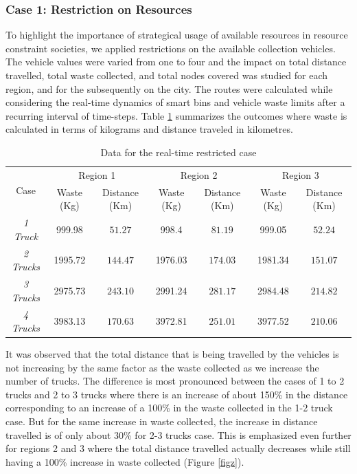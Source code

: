 \documentclass[12pt]{article}
\begin{document}
\subsubsection*{Case 1: Restriction on Resources}
To highlight the importance of strategical usage of available resources in resource constraint societies, we applied restrictions on the available collection vehicles. The vehicle values were varied from one to four and the impact on total distance travelled, total waste collected, and total nodes covered was studied for each region, and for the subsequently on the city. The routes were calculated while considering the real-time dynamics of smart bins and vehicle waste limits after a recurring interval of time-steps. Table \ref{tab1} summarizes the outcomes where waste is calculated in terms of kilograms and distance traveled in kilometres.
\begin{table}[H]
    \centering
    \caption{Data for the real-time restricted case} \label{tab1}
    \vspace*{0.3cm}
    \hspace*{-1cm}
    \begin{tabular}{|c|c|c|c|c|c|c|}
        \hline \multirow{2}{*}{Case} & \multicolumn{2}{c|}{Region 1} & \multicolumn{2}{c|}{Region 2} & \multicolumn{2}{c|}{Region 3}\\
        \cline{2-7}& Waste (Kg)  & Distance (Km) & Waste (Kg) & Distance (Km) & Waste (Kg) & Distance (Km)\\ 
        \hline \textit{1 Truck} & 999.98 & $51.27$ & 998.4 & $81.19$ & 999.05 & $52.24$ \\
        \hline \textit{2 Trucks} & 1995.72 & $144.47$ & 1976.03 & $174.03$ & 1981.34 & $151.07$ \\
        \hline \textit{3 Trucks} & 2975.73 & $243.10$ & 2991.24 & $281.17$ & 2984.48 & $214.82$ \\
        \hline \textit{4 Trucks} & 3983.13 & $170.63$ & 3972.81 & $251.01$ & 3977.52 & $210.06$ \\
        \hline
    \end{tabular}
\end{table}

It was observed that the total distance that is being travelled by the vehicles is not increasing by the same factor as the waste collected as we increase the number of trucks. The difference is most pronounced between the cases of 1 to 2 trucks and 2 to 3 trucks where there is an increase of about 150\% in the distance corresponding to an increase of a 100\% in the waste collected in the 1-2 truck case. But for the same increase in waste collected, the increase in distance travelled is of only about 30\% for 2-3 trucks case. This is emphasized even further for regions 2 and 3 where the total distance travelled actually decreases while still having a 100\% increase in waste collected (Figure \ref{figz}).
\end{document}
